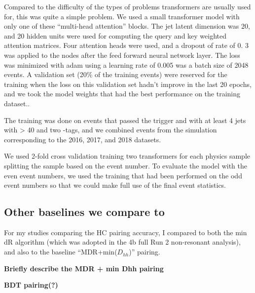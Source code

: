 
Compared to the difficulty of the types of problems transformers are usually used for, this was quite a simple problem.
We used a small transformer model with only one of these ``multi-head attention'' blocks.
The jet latent dimension was 20, and  20 hidden units were used for computing the query and key weighted attention matrices. Four attention heads were used, and a dropout of rate of 0. 3 was applied to the nodes after the feed forward neural network layer. %
The loss was minimized with adam \cite{kingma2014adam} using a learning rate of 0.005 was a batch size of 2048 events. 
A validation set (20\% of the training events) were reserved for the training when the loss on this validation set hadn't improve in the last 20 epochs, and we took the model weights that had the best performance on the training dataset..

The training was done on events that passed the trigger and with at least 4 jets with \pt > 40 \GeV and two \Pqb-tags, and we combined events from the simulation corresponding to the 2016, 2017, and 2018 datasets. 


We used 2-fold cross validation training two transformers for each physics sample splitting the sample based on the event number.  
To evaluate the model with the even event numbers, we used the training that had been performed on the odd event numbers so that we could make full use of the final event statistics.

\subsection{Other baselines we compare to}

For my studies comparing the HC pairing accuracy, I compared to both the min dR algorithm (which was adopted in the 4b full Run 2 non-resonant analysis), and also to the baseline ``MDR+min($D_{hh}$)'' pairing.

\textbf{Briefly describe the MDR + min Dhh pairing}

\textbf{BDT pairing(?)}
